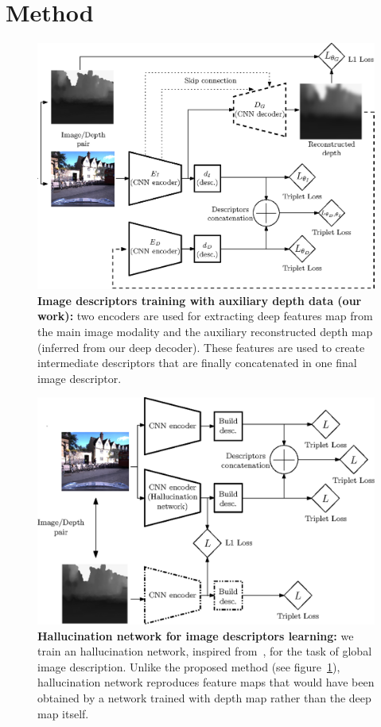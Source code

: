 \section{Method}
\label{sec:method}

\begin{figure}
	\center
	\includegraphics[width=\linewidth]{vect/our_method-inv}
	\caption{\label{fig:our_method} \textbf{Image descriptors training with auxiliary depth data (our work):} two encoders are used for extracting deep features map from the main image modality and the auxiliary reconstructed depth map (inferred from our deep decoder). These features are used to create intermediate descriptors that are finally concatenated in one final image descriptor.}
\end{figure}

\begin{figure}
	\center
	\includegraphics[width=\linewidth]{vect/hall_method-inv}
	\caption{\label{fig:hall_method} \textbf{Hallucination network for image descriptors learning:} we train an hallucination network, inspired from~\cite{Hoffman2016}, for the task of global image description. Unlike the proposed method (see figure~\ref{fig:our_method}), hallucination network reproduces feature maps that would have been obtained by a network trained with depth map rather than the deep map itself.}
\end{figure}

